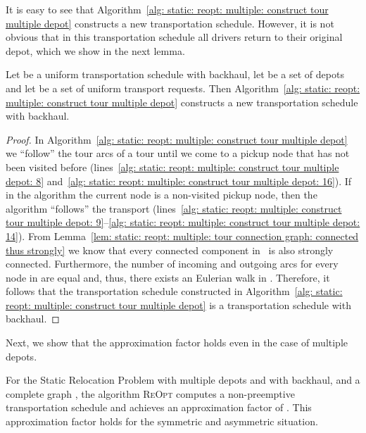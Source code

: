\documentclass[english]{llncs}
\numberwithin{sublemma}{lemma}
\newcommand{\REOPT}{\textsc{ReOpt}\xspace}
\begin{document}
It is easy to see that Algorithm~\ref{alg: static: reopt: multiple: construct tour multiple depot} constructs a new transportation schedule.
However, it is not obvious that in this transportation schedule all drivers return to their original depot, which we show in the next lemma.


\begin{lemma}\label{lem: static: reopt: multiple: connected eq strongly}
Let  be a uniform transportation schedule with backhaul, let  be a set of depots and let  be a set of uniform transport requests.
Then Algorithm~\ref{alg: static: reopt: multiple: construct tour multiple depot} constructs a new transportation schedule with backhaul.
\end{lemma}



\begin{proof}
In Algorithm~\ref{alg: static: reopt: multiple: construct tour multiple depot} we ``follow'' the tour arcs of a tour until we come to a pickup node that has not been visited before
(lines~\ref{alg: static: reopt: multiple: construct tour multiple depot: 8} and~\ref{alg: static: reopt: multiple: construct tour multiple depot: 16}).
If in the algorithm the current node is a non-visited pickup node, then the algorithm ``follows'' the transport
(lines~\ref{alg: static: reopt: multiple: construct tour multiple depot: 9}--\ref{alg: static: reopt: multiple: construct tour multiple depot: 14}).
From Lemma~\ref{lem: static: reopt: multiple: tour connection graph: connected thus strongly} we know that every connected component in~ is also strongly connected.
Furthermore, the number of incoming and outgoing arcs for every node in  are equal and, thus, there exists an Eulerian walk in .
Therefore, it follows that the transportation schedule constructed in Algorithm~\ref{alg: static: reopt: multiple: construct tour multiple depot} is a transportation schedule with backhaul.
\end{proof}




Next, we show that the approximation factor  holds even in the case of multiple depots.


\begin{theorem}\label{thm: static: reopt: multiple: with backhaul: C plus 1}
For the Static Relocation Problem  with multiple depots and with backhaul, and a complete graph ,
the algorithm \REOPT computes a non-preemptive transportation schedule and achieves an approximation factor of .
This approximation factor holds for the symmetric and asymmetric situation.
\end{theorem}
\end{document}
